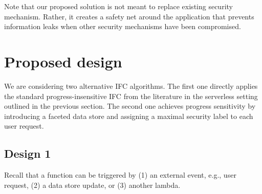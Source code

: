\documentclass[acmsmall,10pt,review,anonymous]{acmart}\settopmatter{printfolios=true}
\begin{document}
Note that our proposed solution is not meant to replace existing 
security mechanism. Rather, it creates a safety net around the 
application that prevents information leaks when other security 
mechanisms have been compromised.  

\section{Proposed design}

We are considering two alternative IFC algorithms.  The first one 
directly applies the standard progress-insensitive IFC from the 
literature in the serverless setting outlined in the previous section.  
The second one achieves progress sensitivity by introducing a faceted 
data store and assigning a maximal security label to each user 
request.

\subsection{Design 1}

Recall that a function can be triggered by (1) an external event, 
e.g., user request, (2) a data store update, or (3) another lambda.
\end{document}
